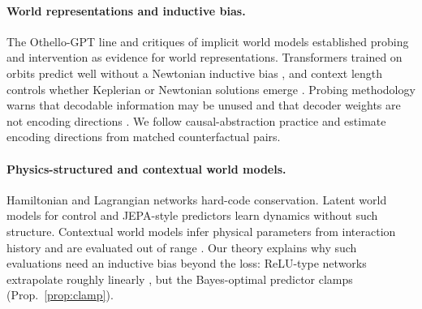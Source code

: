 \paragraph{World representations and inductive bias.} The Othello-GPT line
\citep{li2023othello,nanda2023othello,yuan2025revisiting} and critiques of implicit world models
\citep{vafa2024evaluating} established probing and intervention as evidence for world
representations. Transformers trained on orbits predict well without a Newtonian inductive bias
\citep{vafa2025found}, and context length controls whether Keplerian or Newtonian solutions emerge
\citep{liu2026kepler}. Probing methodology warns that decodable information may be unused
\citep{hewitt2019control,ravichander2021probing,elazar2021amnesic} and that decoder weights are
not encoding directions \citep{haufe2014interpretation}. We follow causal-abstraction practice
\citep{geiger2021causal,geiger2024das} and estimate encoding directions from matched
counterfactual pairs.

\paragraph{Physics-structured and contextual world models.} Hamiltonian and Lagrangian networks
\citep{greydanus2019hnn,cranmer2020lnn,toth2020hgn,lehami2026} hard-code conservation. Latent world
models for control \citep{ha2018world,hafner2020dreamer,hafner2025dreamerv3} and JEPA-style
predictors \citep{assran2023ijepa,bardes2024vjepa,assran2025vjepa2} learn dynamics without such
structure. Contextual world models infer physical parameters from interaction history and are
evaluated out of range \citep{prasanna2024dreaming,dali2025,luo2026physicalworld,lin2026causalwm}.
Our theory explains why such evaluations need an inductive bias beyond the loss: ReLU-type
networks extrapolate roughly linearly \citep{xu2021extrapolate}, but the Bayes-optimal predictor
clamps (Prop.~\ref{prop:clamp}).
